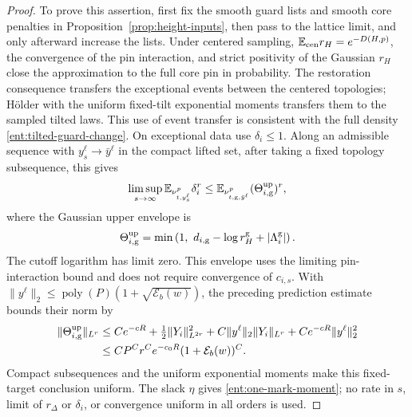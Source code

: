 \begin{proof}
To prove this assertion, first fix the smooth guard lists and smooth
core penalties in Proposition~\ref{prop:height-inputs}, then pass to
the lattice limit, and only afterward increase the lists.  Under
centered sampling, \(\mathbb E_{\rm cen}r_H=e^{-D(H,p)}\), the convergence
of the pin interaction, and strict positivity of the Gaussian
\(r_H\) close the approximation to the full core pin in probability.
The restoration consequence transfers the exceptional events between
the centered topologies; H\"older with the uniform fixed-tilt
exponential moments transfers them to the sampled tilted laws.
This use of event transfer is consistent with the full density
\eqref{ent:tilted-guard-change}.  On exceptional data use
\(\delta_i\le1\).  Along an admissible sequence with
\(y_s^\ell\to\bar y^\ell\) in the compact lifted set, after taking
a fixed topology subsequence, this gives
\[
 \limsup_{s\to\infty}
   \mathbb E_{\nu_{t,y_s^\ell}^p}\delta_i^r
 \le \mathbb E_{\nu_{t,{\rm g},\bar y^\ell}^p}
                         (\Theta_{i,{\rm g}}^{\rm up})^r ,
\]
where the Gaussian upper envelope is
\[
 \Theta_{i,{\rm g}}^{\rm up}
   =\min\left(1,\ d_{i,{\rm g}}-\log r_H^{\rm g}
                                  +|\Lambda_i^{\rm g}|\right).
\]
The cutoff logarithm has limit zero.  This envelope uses the
limiting pin-interaction bound and does not require convergence of
\(c_{i,s}\).  With
\(\|y^\ell\|_2\le\operatorname{poly}(P)
                    (1+\sqrt{\mathcal E_b(w)})\), the preceding
prediction estimate bounds their norm by
\[
\begin{split}
 \|\Theta_{i,{\rm g}}^{\rm up}\|_{L^r}
 &\le Ce^{-cR}+\tfrac12\|Y_i\|_{L^{2r}}^2
       +C\|y^\ell\|_2\|Y_i\|_{L^r}
       +Ce^{-cR}\|y^\ell\|_2^2\\
 &\le CP^Cr^Ce^{-c_0R}(1+\mathcal E_b(w))^C .
\end{split}
\]
Compact subsequences and the uniform exponential moments make this
fixed-target conclusion uniform.  The slack \(\eta\) gives
\eqref{ent:one-mark-moment}; no rate in \(s\), limit of \(r_\Delta\)
or \(\delta_i\), or convergence uniform in all orders is used.


\end{proof}
